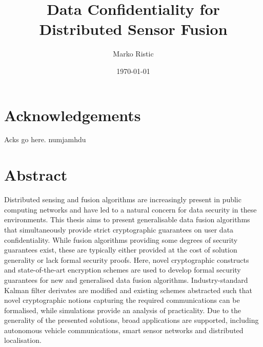 \documentclass[oneside]{scrbook}
\title{Data Confidentiality for Distributed Sensor Fusion}
\author{Marko Ristic}
\date{\today}
\theoremstyle{definition}
\theoremstyle{definition}
\theoremstyle{remark}
\begin{document}
\maketitle

\frontmatter
\tableofcontents

% 
%                                     
%                                     
%                                     
% 

\chapter{Acknowledgements}
Acks go here. numjamhdu

% 
%                                                                
%                                                                
%                                                                
% 

\chapter{Abstract}
Distributed sensing and fusion algorithms are increasingly present in public computing networks and have led to a natural concern for data security in these environments. This thesis aims to present generalisable data fusion algorithms that simultaneously provide strict cryptographic guarantees on user data confidentiality. While fusion algorithms providing some degrees of security guarantees exist, these are typically either provided at the cost of solution generality or lack formal security proofs. Here, novel cryptographic constructs and state-of-the-art encryption schemes are used to develop formal security guarantees for new and generalised data fusion algorithms. Industry-standard Kalman filter derivates are modified and existing schemes abstracted such that novel cryptographic notions capturing the required communications can be formalised, while simulations provide an analysis of practicality. Due to the generality of the presented solutions, broad applications are supported, including autonomous vehicle communications, smart sensor networks and distributed localisation.
\end{document}
